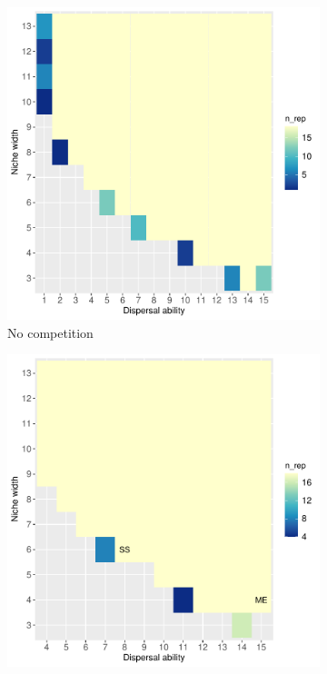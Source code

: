 	\begin{figure}
		\centering
		\begin{subfigure}[b]{0.45\linewidth}
			\includegraphics[width=\linewidth]{./figures/Parameter_space_overlook_no_competition.pdf}
			\caption{No competition}
			\label{fig:para-no}
		\end{subfigure}
		\begin{subfigure}[b]{0.45\linewidth}
			\includegraphics[width=\linewidth]{./figures/Parameter_space_overlook_stable_competition.pdf}

\end{subfigure}
\end{figure}
